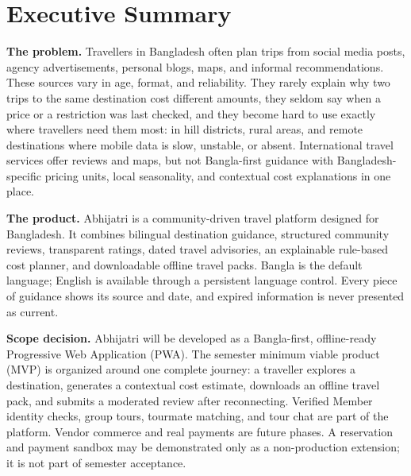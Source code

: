 \documentclass[11pt,a4paper]{article}
\begin{document}
\setcounter{page}{1}
\tableofcontents
\clearpage
{}
\listoffigures
\vspace{8mm}
\listoftables
\clearpage
{}
\setcounter{page}{1}

\section{Executive Summary}
\textbf{The problem.} Travellers in Bangladesh often plan trips from social media posts, agency advertisements, personal blogs, maps, and informal recommendations. These sources vary in age, format, and reliability. They rarely explain why two trips to the same destination cost different amounts, they seldom say when a price or a restriction was last checked, and they become hard to use exactly where travellers need them most: in hill districts, rural areas, and remote destinations where mobile data is slow, unstable, or absent. International travel services offer reviews and maps, but not Bangla-first guidance with Bangladesh-specific pricing units, local seasonality, and contextual cost explanations in one place.

\textbf{The product.} Abhijatri is a community-driven travel platform designed for Bangladesh. It combines bilingual destination guidance, structured community reviews, transparent ratings, dated travel advisories, an explainable rule-based cost planner, and downloadable offline travel packs. Bangla is the default language; English is available through a persistent language control. Every piece of guidance shows its source and date, and expired information is never presented as current.

\textbf{Scope decision.} Abhijatri will be developed as a Bangla-first, offline-ready Progressive Web Application (PWA). The semester minimum viable product (MVP) is organized around one complete journey: a traveller explores a destination, generates a contextual cost estimate, downloads an offline travel pack, and submits a moderated review after reconnecting. Verified Member identity checks, group tours, tourmate matching, and tour chat are part of the platform. Vendor commerce and real payments are future phases. A reservation and payment sandbox may be demonstrated only as a non-production extension; it is not part of semester acceptance.
\end{document}
